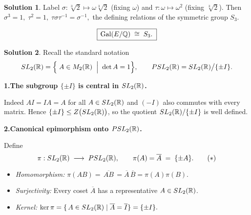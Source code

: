 \documentclass[12pt]{article}
\DeclareMathOperator{\Gal}{Gal}
\theoremstyle{definition} %
\newtheorem{solution}{Solution}
\theoremstyle{plain} %
\begin{document}
\begin{solution}
          Label
          \(\sigma:\sqrt[3]{2}\mapsto\omega\sqrt[3]{2}\) (fixing \(\omega\)) and
          \(\tau:\omega\mapsto\omega^{2}\) (fixing \(\sqrt[3]{2}\)).
          Then
          \(
             \sigma^{3}=1,\;
             \tau^{2}=1,\;
             \tau\sigma\tau^{-1}=\sigma^{-1},
          \)
          the defining relations of the symmetric group \(S_{3}\).
          
          \[
             \boxed{\, \Gal(E/\Bbb Q)\;\cong\;S_{3}. \;}
          \]
          \end{solution}
          \begin{solution}
            Recall the standard notation
            \[
               SL_{2}(\Bbb R)
                  =\Bigl\{\;A\in M_{2}(\Bbb R)\;\Bigm|\;\det A=1\Bigr\},
               \qquad
               PSL_{2}(\Bbb R)
                  =SL_{2}(\Bbb R)\big/\{\pm I\}.
            \]
            
            \bigskip
            \textbf{1.\;The subgroup \(\{\pm I\}\) is central in \(SL_{2}(\Bbb R)\).}
            
            Indeed \(AI=\!IA=A\) for all \(A\in SL_{2}(\Bbb R)\) and
            \((-I)\) also commutes with every matrix.  
            Hence \(\{\pm I\}\le Z\bigl(SL_{2}(\Bbb R)\bigr)\), so the quotient
            \(SL_{2}(\Bbb R)/\{\pm I\}\) is well defined.
            
            \bigskip
            \textbf{2.\;Canonical epimorphism onto \(PSL_{2}(\Bbb R)\).}
            
            Define
            \[
               \pi : SL_{2}(\Bbb R) \;\longrightarrow\; PSL_{2}(\Bbb R),
               \qquad
               \pi(A)=\overline{A}\;=\;\{\pm A\}.
               \tag{\(*\)}
            \]
            \begin{itemize}
               \item \emph{Homomorphism:} 
                     \(\pi(AB)=\overline{\,AB\,}=\overline{A}\,\overline{B}
                             =\pi(A)\pi(B)\).
               \item \emph{Surjectivity:} 
                     Every coset \(\overline{A}\) has a representative \(A\in SL_{2}(\Bbb R)\).
               \item \emph{Kernel:}
                     \(\ker\pi=\{\,A\in SL_{2}(\Bbb R)\mid\overline{A}=\overline{I}\}
                               =\{\pm I\}.
                     \)
            \end{itemize}
            

\end{solution}
\end{document}
